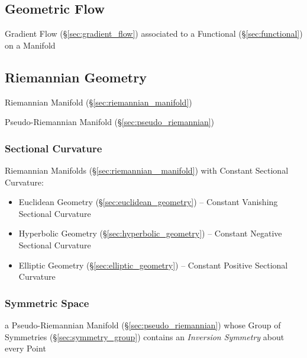 \subsection{Geometric Flow}\label{sec:geometric_flow}

Gradient Flow (\S\ref{sec:gradient_flow}) associated to a Functional
(\S\ref{sec:functional}) on a Manifold



\subsection{Riemannian Geometry}\label{sec:riemannian_geometry}

Riemannian Manifold (\S\ref{sec:riemannian_manifold})

Pseudo-Riemannian Manifold (\S\ref{sec:pseudo_riemannian})



\subsubsection{Sectional Curvature}\label{sec:sectional_curvature}


Riemannian Manifolds (\S\ref{sec:riemannian _manifold}) with Constant Sectional
Curvature:
\begin{itemize}
  \item Euclidean Geometry (\S\ref{sec:euclidean_geometry}) -- Constant
    Vanishing Sectional Curvature
  \item Hyperbolic Geometry (\S\ref{sec:hyperbolic_geometry}) -- Constant
    Negative Sectional Curvature
  \item Elliptic Geometry (\S\ref{sec:elliptic_geometry}) -- Constant Positive
    Sectional Curvature
\end{itemize}



\subsubsection{Symmetric Space}\label{sec:symmetric_space}

a Pseudo-Riemannian Manifold (\S\ref{sec:pseudo_riemannian}) whose Group of
Symmetries (\S\ref{sec:symmetry_group}) contains an \emph{Inversion Symmetry}
about every Point



